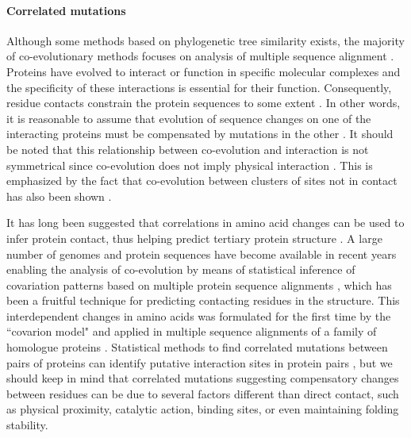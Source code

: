\paragraph{Correlated mutations}
Although some methods based on phylogenetic tree similarity exists, the majority of co-evolutionary methods focuses on analysis of multiple sequence alignment \cite{rohlfs2010detecting}.
Proteins have evolved to interact or function in specific molecular complexes and the specificity of these interactions is essential for their function. Consequently, residue contacts constrain the protein sequences to some extent \cite{pazos1997correlated}.
In other words, 
it is reasonable to assume that evolution of sequence changes on one of the interacting proteins must be compensated by mutations in the other \cite{pazos1997correlated}.
It should be noted that this relationship between co-evolution and interaction is not symmetrical
since co-evolution does not imply physical interaction \cite{fares2006novel}.
This is emphasized by the fact that co-evolution between clusters of sites not in contact has also been shown \cite{pritchard2000proteins}.

It has long been suggested that correlations in amino acid changes can be used to infer protein contact, thus helping predict tertiary protein structure \cite{fitch1970improved, morcos2011direct, burger2010disentangling, de2013emerging}.
A large number of genomes and protein sequences have become available in recent years enabling the analysis of co-evolution by means of statistical inference of covariation patterns based on multiple protein sequence alignments \cite{burger2010disentangling, burger2010disentangling}, which has been a fruitful technique for predicting contacting residues in the structure.
This interdependent changes in amino acids was formulated for the first time by the ``covarion model" \cite{fitch1970improved} and applied in multiple sequence alignments of a family of homologue proteins \cite{de2013emerging}.
Statistical methods to find correlated mutations between pairs of proteins can identify putative interaction sites in protein pairs \cite{de2013emerging}, but we should keep in mind that correlated mutations suggesting compensatory changes between residues can be due to several factors different than direct contact, such as physical proximity, catalytic action, binding sites, or even maintaining folding stability.

